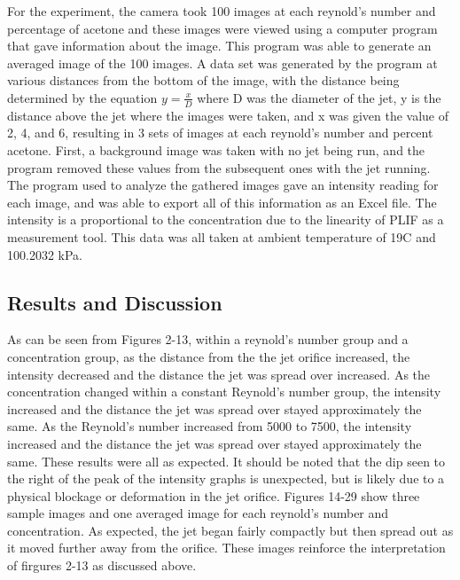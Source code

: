 \documentclass[preview,12pt]{article}
\begin{document}
\indent For the experiment, the camera took 100 images at each reynold's number and percentage of acetone and these images were viewed using a computer program that gave information about the image.  This program was able to generate an averaged image of the 100 images.  A data set was generated by the program at various distances from the bottom of the image, with the distance being determined by the equation $y=\frac{x}{D}$ where D was the diameter of the jet, y is the distance above the jet where the images were taken, and x was given the value of 2, 4, and 6, resulting in 3 sets of images at each reynold's number and percent acetone.  First, a background image was taken with no jet being run, and the program removed these values from the subsequent ones with the jet running. \newline
\indent The program used to analyze the gathered images gave an intensity reading for each image, and was able to export all of this information as an Excel file.  The intensity is a proportional to the concentration due to the linearity of PLIF as a measurement tool.  This data was all taken at ambient temperature of 19\degree C and 100.2032 kPa.
$$$$
\begin{center}
    \section*{Results and Discussion}
\end{center}
As can be seen from Figures 2-13, within a reynold's number group and a concentration group, as the distance from the the jet orifice increased, the intensity decreased and the distance the jet was spread over increased.  As the concentration changed within a constant Reynold's number group, the intensity increased and the distance the jet was spread over stayed approximately the same.  As the Reynold's number increased from 5000 to 7500, the intensity increased and the distance the jet was spread over stayed approximately the same. These results were all as expected.  It should be noted that the dip seen to the right of the peak of the intensity graphs is unexpected, but is likely due to a physical blockage or deformation in the jet orifice.\newline
\indent Figures 14-29 show three sample images and one averaged image for each reynold's number and concentration.  As expected, the jet began fairly compactly but then spread out as it moved further away from the orifice.  These images reinforce the interpretation of firgures 2-13 as discussed above. 
\end{document}
